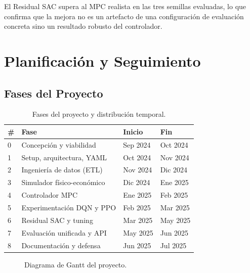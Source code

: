 \documentclass[12pt, a4paper, twoside]{report}
\begin{document}
El Residual SAC supera al MPC realista en las tres semillas evaluadas, lo que
confirma que la mejora no es un artefacto de una configuración de evaluación
concreta sino un resultado robusto del controlador.


\chapter{Planificación y Seguimiento}
\label{chap:planificacion}

\section{Fases del Proyecto}

\begin{table}[H]
\centering
\caption{Fases del proyecto y distribución temporal.}
\label{tab:fases}
\begin{tabularx}{\textwidth}{C{0.5cm}L{4.2cm}C{1.8cm}C{1.8cm}}
\toprule
\textbf{\#} & \textbf{Fase} & \textbf{Inicio} & \textbf{Fin} \\
 & Concepción y viabilidad & Sep 2024 & Oct 2024 \\
1 & Setup, arquitectura, YAML & Oct 2024 & Nov 2024 \\
2 & Ingeniería de datos (ETL) & Nov 2024 & Dic 2024 \\
3 & Simulador físico-económico & Dic 2024 & Ene 2025 \\
4 & Controlador MPC & Ene 2025 & Feb 2025 \\
5 & Experimentación DQN y PPO & Feb 2025 & Mar 2025 \\
6 & Residual SAC y tuning & Mar 2025 & May 2025 \\
7 & Evaluación unificada y API & May 2025 & Jun 2025 \\
8 & Documentación y defensa & Jun 2025 & Jul 2025 \\
\bottomrule
\end{tabularx}
\end{table}

\begin{figure}[H]
  \centering
  \caption{Diagrama de Gantt del proyecto.}
  \label{fig:gantt}
\end{figure}
\end{document}
